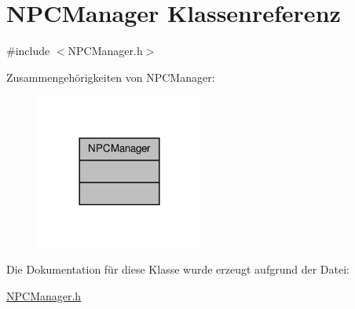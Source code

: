 \hypertarget{class_n_p_c_manager}{\section{N\-P\-C\-Manager Klassenreferenz}
\label{class_n_p_c_manager}
}


{\ttfamily \#include $<$N\-P\-C\-Manager.\-h$>$}



Zusammengehörigkeiten von N\-P\-C\-Manager\-:
\nopagebreak
\begin{figure}[H]
\begin{center}
\leavevmode
\includegraphics[width=156pt]{class_n_p_c_manager__coll__graph}
\end{center}
\end{figure}


Die Dokumentation für diese Klasse wurde erzeugt aufgrund der Datei\-:\begin{DoxyCompactItemize}
\item 
\hyperlink{_n_p_c_manager_8h}{N\-P\-C\-Manager.\-h}\end{DoxyCompactItemize}
